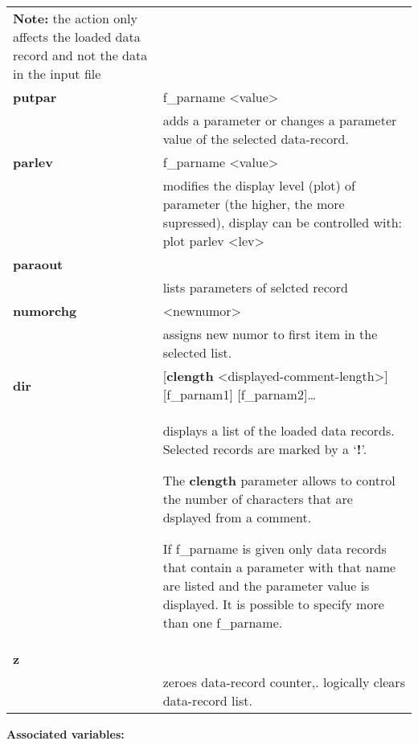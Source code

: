 \documentclass[]{article}
\begin{document}
\begin{longtable}[]{@{}ll@{}}
\begin{minipage}[t]{0.47\columnwidth}
\textbf{Note:} the action only affects the loaded data record and not
the data in the input file\strut
\end{minipage}\tabularnewline
\textbf{putpar} & f\_parname
\textless{}value\textgreater{}\tabularnewline
& adds a parameter or changes a parameter value of the selected
data-record.\tabularnewline
\textbf{parlev} & f\_parname
\textless{}value\textgreater{}\tabularnewline
& modifies the display level (plot) of parameter (the higher, the more
supressed), display can be controlled with: plot parlev
\textless{}lev\textgreater{}\tabularnewline
\textbf{paraout} &\tabularnewline
& lists parameters of selcted record\tabularnewline
\textbf{numorchg} & \textless{}newnumor\textgreater{}\tabularnewline
& assigns new numor to first item in the selected list.\tabularnewline
\textbf{dir} & {[}\textbf{clength}
\textless{}displayed-comment-length\textgreater{}{]} {[}f\_parnam1{]}
{[}f\_parnam2{]}\ldots{}\tabularnewline
\begin{minipage}[t]{0.47\columnwidth}\raggedright
\strut
\end{minipage} & \begin{minipage}[t]{0.47\columnwidth}\raggedright
displays a list of the loaded data records. Selected records are marked
by a `\textbf{!}'.

The \textbf{clength} parameter allows to control the number of
characters that are dsplayed from a comment.

If f\_parname is given only data records that contain a parameter with
that name are listed and the parameter value is displayed. It is
possible to specify more than one f\_parname.\strut
\end{minipage}\tabularnewline
\textbf{z} &\tabularnewline
& zeroes data-record counter,. logically clears data-record
list.\tabularnewline
\bottomrule
\end{longtable}

\textbf{Associated variables: }
\end{document}
